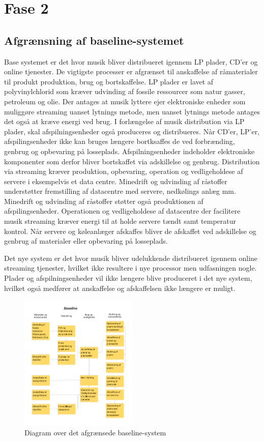 \section*{Fase 2}

\subsection*{Afgrænsning af baseline-systemet}

Base systemet er det hvor musik bliver distribueret igennem LP plader, CD'er og online tjenester. De vigtigste processer er afgrænset til anskaffelse af råmaterialer til produkt produktion, brug og bortskaffelse.
LP plader er lavet af polyvinylchlorid som kræver udvinding af fossile ressourcer som natur gasser, petroleum og olie. 
Der antages at musik lyttere ejer elektroniske enheder som muliggøre streaming uanset lytnings metode, men uanset lytnings metode antages det også at kræve energi ved brug.
I forlængelse af musik distribution via LP plader, skal afspilningsenheder også produceres og distribueres. 
Når CD'er, LP'er, afspilingsenheder ikke kan bruges længere bortksaffes de ved forbrænding, genbrug og opbevaring på losseplads.
Afspilningsenheder indeholder elektroniske komponenter som derfor bliver bortskaffet via adskillelse og genbrug.
Distribution via streaming kræver produktion, opbevaring, operation og vedligeholdese af servere i eksempelvis et data centre.
Minedrift og udvinding af råstoffer understøtter fremstilling af datacentre med servere, nedkølings anlæg mm.
Minedrift og udvinding af råstoffer støtter også produktionen af afspilingsenheder. 
Operationen og vedligeholdese af datacentre der facilitere musik streaming kræver energi til at holde servere tændt samt temperatur kontrol.
Når servere og køleanlæger afskaffes bliver de afskaffet ved adskillelse og genbrug af materialer eller opbevaring på losseplads.

Det nye system er det hvor musik bliver udelukkende distribueret igennem online streaming tjenester, hvilket ikke resultere i nye processor men udfasningen nogle.
Plader og afspilningsenheder vil ikke længere blive produceret i det nye system, hvilket også medfører at anskaffelse og afskaffelsen ikke længere er muligt.


\begin{figure}[H]
    \centering
    \includegraphics[width=0.5\textwidth]{images/baseline.png}
    \caption{Diagram over det afgrænsede baseline-system}
    \label{fig:baseline}
\end{figure} 


